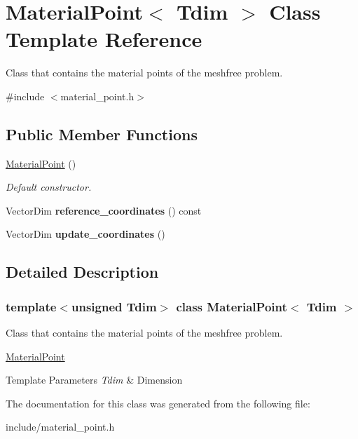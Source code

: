 \hypertarget{class_material_point}{}\section{Material\+Point$<$ Tdim $>$ Class Template Reference}
\label{class_material_point}


Class that contains the material points of the meshfree problem.  




{\ttfamily \#include $<$material\+\_\+point.\+h$>$}

\subsection*{Public Member Functions}
\begin{DoxyCompactItemize}
\item 
\mbox{\label{class_material_point_ac89f3f94be53691e347ffbda8d772b60}} 
\hyperlink{class_material_point_ac89f3f94be53691e347ffbda8d772b60}{Material\+Point} ()
\begin{DoxyCompactList}\small\item\em Default constructor. \end{DoxyCompactList}\item 
\mbox{\label{class_material_point_aeb0f8e7cf5670768e1139bae35e3bf02}} 
Vector\+Dim {\bfseries reference\+\_\+coordinates} () const
\item 
\mbox{\label{class_material_point_aac356c30f6604c25fae7cfe4902d3bcf}} 
Vector\+Dim {\bfseries update\+\_\+coordinates} ()
\end{DoxyCompactItemize}


\subsection{Detailed Description}
\subsubsection*{template$<$unsigned Tdim$>$\newline
class Material\+Point$<$ Tdim $>$}

Class that contains the material points of the meshfree problem. 

\hyperlink{class_material_point}{Material\+Point} 
\begin{DoxyTemplParams}{Template Parameters}
{\em Tdim} & Dimension \\
\hline
\end{DoxyTemplParams}


The documentation for this class was generated from the following file\+:\begin{DoxyCompactItemize}
\item 
include/material\+\_\+point.\+h\end{DoxyCompactItemize}

